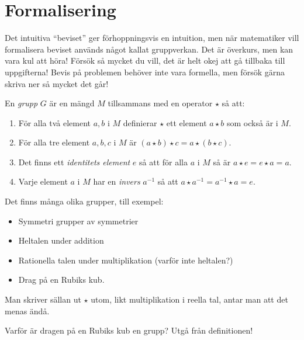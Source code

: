 \section{Formalisering}
Det intuitiva ``beviset'' ger förhoppningsvis en intuition, men när matematiker vill formalisera beviset används något kallat gruppverkan. Det är överkurs, men kan vara kul att höra! Försök så mycket du vill, det är helt okej att gå tillbaka till uppgifterna! Bevis på problemen behöver inte vara formella, men försök gärna skriva ner så mycket det går!

\begin{definition}[Grupp]
	En \textit{grupp} \(G\) är en mängd \(M\) tillsammans med en operator \(\star \) så att:
  \begin{enumerate} %
    \item För alla två element \(a, b\) i \(M\) definierar \( \star \) ett element \(a  \star b\) som också är i \(M\).
    \item För alla tre element \(a, b, c\) i \(M\) är \((a  \star b)  \star c = a  \star (b  \star c)\).
    \item Det finns ett \textit{identitets element} \(e\) så att för alla \(a\) i \(M\) så är \(a  \star e = e  \star a = a\).
    \item Varje element \(a\) i \(M\) har en \textit{invers}  \(a ^{-1}\) så att \(a  \star a^{-1} = a^{-1}  \star a = e\).
  \end{enumerate}
\end{definition}

\begin{exempel}
	Det finns många olika grupper, till exempel:
	\begin{itemize}
		\item Symmetri grupper av symmetrier
		\item Heltalen under addition
		\item Rationella talen under multiplikation (varför inte heltalen?)
		\item Drag på en Rubiks kub.
	\end{itemize}
	
\end{exempel}

\begin{obs}
	Man skriver sällan ut \(\star\) utom, likt multiplikation i reella tal, antar man att det menas ändå.
\end{obs}

\begin{problem}
	Varför är dragen på en Rubiks kub en grupp? Utgå från definitionen!
\end{problem}

